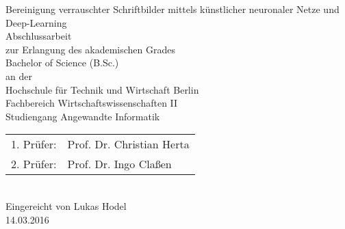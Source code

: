 


\begin{titlepage}
  \begin{center}
    \huge
    Bereinigung verrauschter Schriftbilder mittels künstlicher neuronaler Netze und Deep-Learning\\
    \vspace{1cm}\huge
    Abschlussarbeit\\
    \vspace{1cm}\large
    {\large zur Erlangung des akademischen Grades}\\
    {\large Bachelor of Science (B.Sc.)}\\
    \vspace{1cm}\large
    {\large an der}\\
    \vspace{1cm}\large
		{\large Hochschule für Technik und Wirtschaft Berlin}\\
    {\large Fachbereich Wirtschaftswissenschaften II}\\
    {\large Studiengang Angewandte Informatik}\\
    \vspace{1cm}\large
    \begin{tabular}{ll}
      1. Prüfer:            & Prof. Dr. Christian Herta\\
      2. Prüfer:            & Prof. Dr. Ingo Claßen\\
    \end{tabular}
    \vspace{1cm}\large
    \\
		Eingereicht von Lukas Hodel\\
    \vspace{1cm}\large
    14.03.2016

  \end{center}

\end{titlepage}
